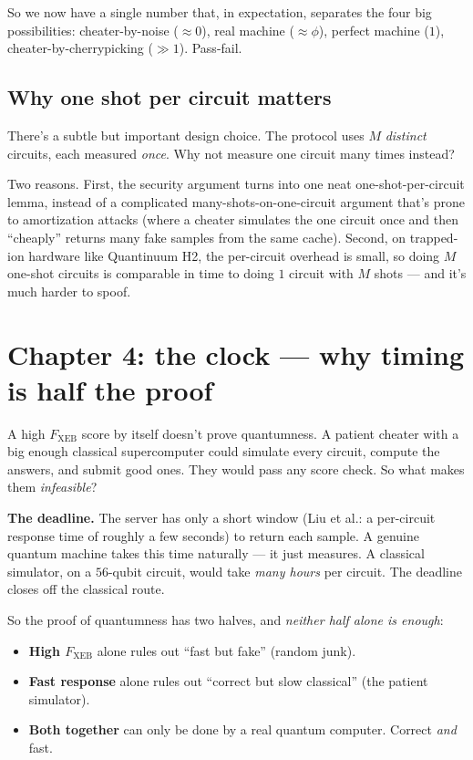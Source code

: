 \documentclass[11pt]{article}
\newcommand{\Fxeb}{F_{\text{XEB}}}
\begin{document}
So we now have a single number that, in expectation, separates the four big possibilities: cheater-by-noise ($\approx 0$), real machine ($\approx \phi$), perfect machine ($1$), cheater-by-cherrypicking ($\gg 1$). Pass-fail.

\subsection*{Why one shot per circuit matters}

There's a subtle but important design choice. The protocol uses $M$ \emph{distinct} circuits, each measured \emph{once}. Why not measure one circuit many times instead?

Two reasons. First, the security argument turns into one neat one-shot-per-circuit lemma, instead of a complicated many-shots-on-one-circuit argument that's prone to amortization attacks (where a cheater simulates the one circuit once and then ``cheaply'' returns many fake samples from the same cache). Second, on trapped-ion hardware like Quantinuum H2, the per-circuit overhead is small, so doing $M$ one-shot circuits is comparable in time to doing $1$ circuit with $M$ shots --- and it's much harder to spoof.

\section{Chapter 4: the clock --- why timing is half the proof}

A high $\Fxeb$ score by itself doesn't prove quantumness. A patient cheater with a big enough classical supercomputer could simulate every circuit, compute the answers, and submit good ones. They would pass any score check. So what makes them \emph{infeasible}?

\textbf{The deadline.} The server has only a short window (Liu et al.: a per-circuit response time of roughly a few seconds) to return each sample. A genuine quantum machine takes this time naturally --- it just measures. A classical simulator, on a $56$-qubit circuit, would take \emph{many hours} per circuit. The deadline closes off the classical route.

So the proof of quantumness has two halves, and \emph{neither half alone is enough}:

\begin{itemize}[leftmargin=2em, itemsep=2pt]
\item \textbf{High $\Fxeb$} alone rules out ``fast but fake'' (random junk).
\item \textbf{Fast response} alone rules out ``correct but slow classical'' (the patient simulator).
\item \textbf{Both together} can only be done by a real quantum computer. Correct \emph{and} fast.
\end{itemize}
\end{document}
